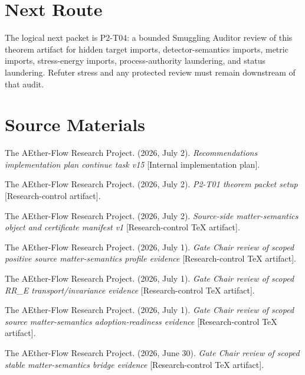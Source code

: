 \documentclass[11pt]{article}
\begin{document}
\section{Next Route}

The logical next packet is P2-T04: a bounded Smuggling Auditor review of this
theorem artifact for hidden target imports, detector-semantics imports,
metric imports, stress-energy imports, process-authority laundering, and status
laundering. Refuter stress and any protected review must remain downstream of
that audit.

\section{Source Materials}

The AEther-Flow Research Project. (2026, July 2). \emph{Recommendations
implementation plan continue task v15} [Internal implementation plan].

The AEther-Flow Research Project. (2026, July 2). \emph{P2-T01 theorem packet
setup} [Research-control artifact].

The AEther-Flow Research Project. (2026, July 2). \emph{Source-side
matter-semantics object and certificate manifest v1} [Research-control TeX
artifact].

The AEther-Flow Research Project. (2026, July 1). \emph{Gate Chair review of
scoped positive source matter-semantics profile evidence} [Research-control
TeX artifact].

The AEther-Flow Research Project. (2026, July 1). \emph{Gate Chair review of
scoped RR\_E transport/invariance evidence} [Research-control TeX artifact].

The AEther-Flow Research Project. (2026, July 1). \emph{Gate Chair review of
scoped source matter-semantics adoption-readiness evidence} [Research-control
TeX artifact].

The AEther-Flow Research Project. (2026, June 30). \emph{Gate Chair review of
scoped stable matter-semantics bridge evidence} [Research-control TeX
artifact].
\end{document}
